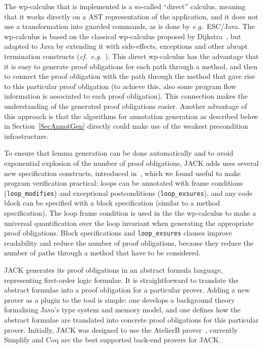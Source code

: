The wp-calculus that is implemented is a
so-called ``direct'' calculus, meaning that it works directly on a AST
representation of the application, and it does not use a
transformation into guarded commands, as is done by \emph{e.g.}\
ESC/Java.  The wp-calculus is based on the classical wp-calculus
proposed by Dijkstra~\cite{Dijkstra75}, but adapted to Java by
extending it with side-effects, exceptions and other abrupt
termination constructs (\emph{cf.}\
\emph{e.g.}~\cite{Jacobs04}). This direct wp-calculus has the advantage
that it is easy to generate proof obligations for each path through a
method, and then to connect the proof obligation with the path through
the method that gave rise to this particular proof obligation (to
achieve this, also some program flow information is associated to each
proof obligation). This connection makes the understanding of the
generated proof obligations easier. Another advantage of this approach
is that the algorithms for annotation generation as described below in
Section~\ref{SecAnnotGen} directly could make use of the weakest
precondition infrastructure.


To ensure that lemma generation can be done automatically and to avoid
exponential explosion of the number of proof obligations, JACK adds
uses several new specification constructs, introduced
in~\cite{BurdyRL03}, which we found useful to make program
verification practical: loops can be annotated with frame conditions
(\texttt{loop\_modifies}) and exceptional postconditions
(\texttt{loop\_exsures}), and any code block can be specified with a
block specification (similar to a method specification). The loop
frame condition is used in the the wp-calculus to make a universal
quantification over the loop invariant when generating the
appropriate proof obligations. Block specifications and
\texttt{loop\_exsures} clauses improve readability and reduce the
number of proof obligations, because they reduce the number of paths
through a method that have to be considered.


JACK generates its proof obligations in an abstract formula language,
representing first-order logic formulae. It is straightforward to
translate the abstract formulae into a proof obligation for a
particular prover. Adding a new prover as a plugin to the tool is
simple: one develops a background theory formalising Java's type
system and memory model, and one defines how the abstract formulae are
translated into concrete proof obligations for this particular
prover. Initially, JACK was designed to use the AtelierB
prover~\cite{Abrial96}, currently Simplify and Coq are the best
supported back-end provers for JACK.




